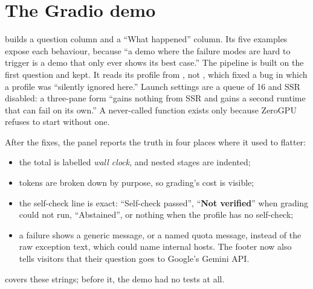\section{The Gradio demo}
\label{sec:demo}

 builds a question column and a ``What happened'' column. Its five examples expose each behaviour, because ``a demo where the failure modes are hard to trigger is a demo that only ever shows its best case.'' The pipeline is built on the first question and kept. It reads its profile from , not , which fixed a bug in which a  profile was ``silently ignored here.'' Launch settings are a queue of 16 and SSR disabled: a three-pane form ``gains nothing from SSR and gains a second runtime that can fail on its own.'' A never-called  function exists only because ZeroGPU refuses to start without one.

After the fixes, the panel reports the truth in four places where it used to flatter:
\begin{itemize}
  \item the total is labelled \emph{wall clock}, and nested stages are indented;
  \item tokens are broken down by purpose, so grading's cost is visible;
  \item the self-check line is exact: ``Self-check passed'', ``\textbf{Not verified}'' when grading could not run, ``Abstained'', or nothing when the profile has no self-check;
  \item a failure shows a generic message, or a named quota message, instead of the raw exception text, which could name internal hosts. The footer now also tells visitors that their question goes to Google's Gemini API.
\end{itemize}
 covers these strings; before it, the demo had no tests at all.
